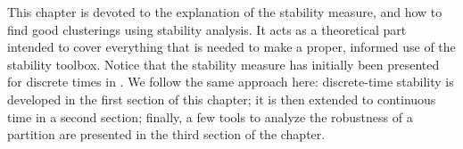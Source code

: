This chapter is devoted to the explanation of the stability measure, and how to find good clusterings using stability analysis. It acts as a theoretical part intended to cover everything that is needed to make a proper, informed use of the stability toolbox. Notice that the stability measure has initially been presented for discrete times in \cite{delvenne2010stability}. We follow the same approach here: discrete-time stability is developed in the first section of this chapter; it is then extended to continuous time in a second section; finally, a few tools to analyze the robustness of a partition are presented in the third section of the chapter.


